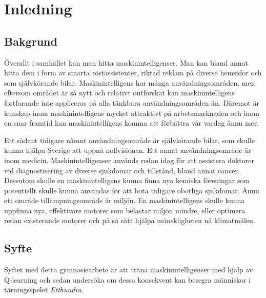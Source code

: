 \documentclass[12pt,a4paper]{article}
\begin{document}
  \thispagestyle{empty}
  \tableofcontents
  \cleardoublepage




  \section{Inledning}\label{sec:inledning}
    \subsection{Bakgrund}\label{subsec:bakgrund}
      Överallt i samhället kan man hitta maskinintelligenser. Man kan bland annat hitta dem i form av smarta röstassistenter, riktad reklam på diverse hemsidor och som självkörande bilar. Maskinintelligens har många användningsområden, men eftersom området är så nytt och relativt outforskat kan maskinintelligens fortfarande inte appliceras på alla tänkbara användningsområden än. Däremot är kunskap inom maskinintelligens mycket attraktivt på arbetsmarknaden och inom en snar framtid kan maskinintelligens komma att förbättra vår vardag ännu mer. \cite{ref:stackoverflowai}

      Ett sådant tidigare nämnt användningsområde är självkörande bilar, som skulle kunna hjälpa Sverige att uppnå nollvisionen. Ett annat användningsområde är inom medicin. Maskinintelligenser används redan idag för att assistera doktorer vid diagnostisering av diverse sjukdomar och tillstånd, bland annat cancer. \cite{ref:cancer} Dessutom skulle en maskinintelligens kunna finna nya kemiska föreningar som potentiellt skulle kunna användas för att bota tidigare obotliga sjukdomar. \cite{ref:antibiotika} Ännu ett område tillämpningsområde är miljön. En maskinintelligens skulle kunna uppfinna nya, effektivare motorer som belastar miljön mindre, eller optimera redan existerande motorer och på så sätt hjälpa mänskligheten nå klimatmålen. \cite{ref:motorer}

    
    \subsection{Syfte}\label{subsec:syfte}
      Syftet med detta gymnasiearbete är att träna maskinintelligenser med hjälp av Q-learning och sedan undersöka om dessa konsekvent kan besegra människor i tärningsspelet \emph{Etthundra}.
\end{document}
